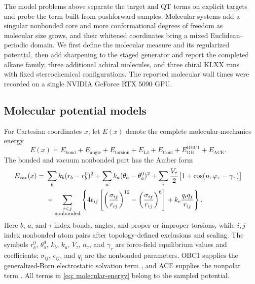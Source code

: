 \documentclass{article}
\begin{document}
The model problems above separate the target and QT terms on explicit targets and probe the term built from pushforward samples. Molecular systems add a singular nonbonded core and more conformational degrees of freedom as molecular size grows, and their whitened coordinates \citep{noe2019boltzmann} bring a mixed Euclidean--periodic domain. We first define the molecular measure and its regularized potential, then add sharpening to the staged generator and report the completed alkane family, three additional achiral molecules, and three chiral KLXX runs with fixed stereochemical configurations. The reported molecular wall times were recorded on a single NVIDIA GeForce RTX 5090 GPU.

\subsection{Molecular potential models}
\label{sec: mol-models}

For Cartesian coordinates \(x\), let \(E(x)\) denote the complete molecular-mechanics energy
\begin{equation}
E(x)
=E_{\mathrm{bond}}+E_{\mathrm{angle}}+E_{\mathrm{torsion}}
 +E_{\mathrm{LJ}}+E_{\mathrm{Coul}}
 +E_{\mathrm{GB}}^{\mathrm{OBC1}}+E_{\mathrm{ACE}} .
\label{eq: molecular-energy}
\end{equation}
The bonded and vacuum nonbonded part has the Amber form \citep{cornell1995amber}
\begin{align}
E_{\mathrm{vac}}(x)
={}&\sum_{b} k_b(r_b-r_b^0)^2
 +\sum_{a} k_a(\theta_a-\theta_a^0)^2
 +\sum_{\tau}\frac{V_\tau}{2}
       \bigl[1+\cos(n_\tau\varphi_\tau-\gamma_\tau)\bigr] \notag\\
&+\sum_{\substack{i<j\\\mathrm{nonbonded}}}
 \left\lbrace 4\epsilon_{ij}\left[
 \left(\frac{\sigma_{ij}}{r_{ij}}\right)^{12}
 -\left(\frac{\sigma_{ij}}{r_{ij}}\right)^6\right]
 +k_{\mathrm e}\frac{q_iq_j}{r_{ij}}\right\rbrace .
\label{eq: molecular-amber-energy}
\end{align}
Here $b$, $a$, and $\tau$ index bonds, angles, and proper or improper torsions, while $i,j$ index nonbonded atom pairs after topology-defined exclusions and scaling. The symbols $r_b^0$, $\theta_a^0$, $k_b$, $k_a$, $V_\tau$, $n_\tau$, and $\gamma_\tau$ are force-field equilibrium values and coefficients; $\sigma_{ij}$, $\epsilon_{ij}$, and $q_i$ are the nonbonded parameters. OBC1 supplies the generalized-Born electrostatic solvation term \citep{onufriev2004gb}, and ACE supplies the nonpolar term \citep{schaefer1996ace}. All terms in \eqref{eq: molecular-energy} belong to the sampled potential.
\end{document}
